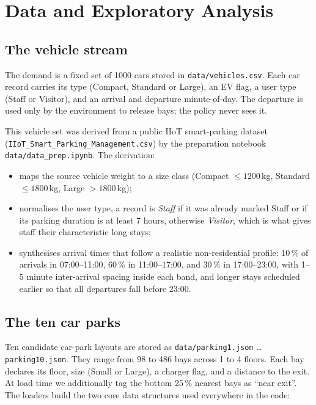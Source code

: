 \documentclass[11pt,a4paper]{article}
\newcommand{\code}[1]{\texttt{\small #1}}
\begin{document}
\section{Data and Exploratory Analysis}

\subsection{The vehicle stream}

The demand is a fixed set of 1000 cars stored in \code{data/vehicles.csv}. Each car
record carries its type (Compact, Standard or Large), an EV flag, a user type (Staff or
Visitor), and an arrival and departure minute-of-day. The departure is used only by the
environment to release bays; the policy never sees it.

This vehicle set was derived from a public IIoT smart-parking dataset
(\code{IIoT\_Smart\_Parking\_Management.csv}) by the preparation notebook
\code{data/data\_prep.ipynb}. The derivation:
\begin{itemize}[leftmargin=1.4em]
  \item maps the source vehicle weight to a size class (Compact $\le 1200$\,kg,
        Standard $\le 1800$\,kg, Large $>1800$\,kg);
  \item normalises the user type, a record is \emph{Staff} if it was already marked
        Staff or if its parking duration is at least 7 hours, otherwise \emph{Visitor}, which is what gives staff their characteristic long stays;
  \item synthesises arrival times that follow a realistic non-residential profile:
        10\,\% of arrivals in 07:00--11:00, 60\,\% in 11:00--17:00, and 30\,\% in
        17:00--23:00, with 1--5 minute inter-arrival spacing inside each band, and longer
        stays scheduled earlier so that all departures fall before 23:00.
\end{itemize}

\subsection{The ten car parks}

Ten candidate car-park layouts are stored as \code{data/parking1.json} \dots
\code{parking10.json}. They range from 98 to 486 bays across 1 to 4 floors. Each bay
declares its floor, size (Small or Large), a charger flag, and a distance to the exit.
At load time we additionally tag the bottom 25\,\% nearest bays as ``near exit''. The
loaders build the two core data structures used everywhere in the code:
\end{document}
